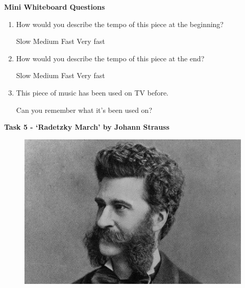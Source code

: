 \documentclass{article}
\begin{document}
\vspace{2em}

\begin{tcolorbox}[width=\textwidth]
\noindent\textbf{Mini Whiteboard Questions}

\vspace{1em}

\begin{enumerate}[leftmargin=1em, itemsep=0pt, parsep=0pt, topsep=0pt]
    \item How would you describe the tempo of this piece at the beginning?
    \vspace{1em}

    \begin{flushleft}
        Slow  \hfill Medium  \hfill Fast \hfill Very fast \\
    \end{flushleft}
    \vspace{1em}
    \item How would you describe the tempo of this piece at the end?
    \vspace{1em}
    \begin{flushleft}
         Slow  \hfill Medium  \hfill Fast \hfill Very fast \\
         \end{flushleft}
    \vspace{2em}
    \item This piece of music has been used on TV before.

\par \noindent    Can you remember what it’s been used on?
    \vspace{2em}
    

\end{enumerate}
\end{tcolorbox}
\newpage

\begin{center}
    \fontsize{18}{22}\selectfont
    \textbf{Task 5 - ‘Radetzky March' by Johann Strauss}
\end{center}
\setlength{\columnsep}{1.5em}
\begin{figure}
    \vspace{-0.8em}
    \centering
    \includegraphics[width=\linewidth]{t5pic.jpg} %
\end{figure}
\vspace{1em}
\end{document}
